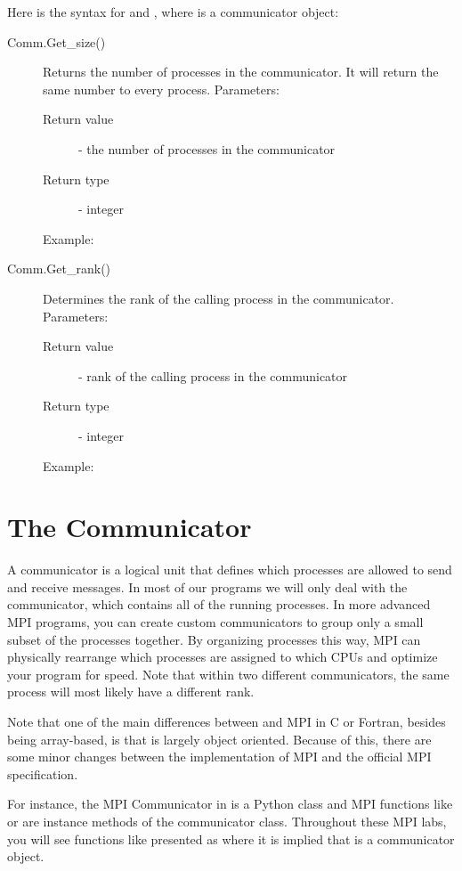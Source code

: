 Here is the syntax for  and , where  is a communicator object:
\begin{description}
\item[Comm.Get\_size()]
Returns the number of processes in the communicator. It will return the same number to every process.
Parameters:
\begin{description}
    \item[Return value] - the number of processes in the communicator
    \item[Return type] - integer
\end{description}
Example:

\item[Comm.Get\_rank()]
Determines the rank of the calling process in the communicator.
Parameters:
\begin{description}
    \item[Return value] - rank of the calling process in the communicator
    \item[Return type] - integer
\end{description}
Example:

\end{description}

\section*{The Communicator}
A communicator is a logical unit that defines which processes are allowed to 
send and receive messages. In most of our programs we will only deal with the  
communicator, which contains all of the running processes. 
In more advanced MPI programs, you can create custom communicators to group only a small 
subset of the processes together. By organizing processes this way, MPI can 
physically rearrange which processes are assigned to which CPUs and optimize your 
program for speed. Note that within two different communicators, the same process 
will most likely have a different rank.

Note that one of the main differences between  and MPI in C or Fortran, 
besides being array-based, is that  is largely object oriented. 
Because of this, there are some minor changes between the  implementation of 
MPI and the official MPI specification.

For instance, the MPI Communicator in  is a Python class and MPI functions 
like  or  are instance methods of the communicator class. 
Throughout these MPI labs, you will see functions like  presented as 
 where it is implied that  is a communicator object.

